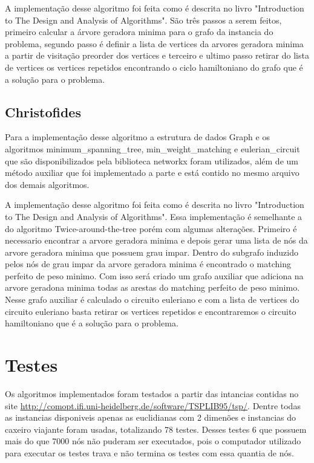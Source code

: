 \documentclass[12pt]{article}
\begin{document}
A implementação desse algoritmo foi feita como é descrita no livro "Introduction to The Design and Analysis of Algorithms". São três passos a serem feitos, primeiro calcular a árvore geradora minima para o grafo da instancia do problema, segundo passo é definir a lista de vertices da arvores geradora minima a partir de visitação preorder dos vertices e terceiro e ultimo passo retirar do lista de vertices os vertices repetidos encontrando o ciclo hamiltoniano do grafo que é a solução para o problema.

\subsection{Christofides}

Para a implementação desse algoritmo a estrutura de dados Graph e os algoritmos minimum\_spanning\_tree, min\_weight\_matching e eulerian\_circuit que são disponibilizados pela biblioteca networkx foram utilizados, além de um método auxiliar que foi implementado a parte e está contido no mesmo arquivo dos demais algoritmos.

A implementação desse algoritmo foi feita como é descrita no livro "Introduction to The Design and Analysis of Algorithms". Essa implementação é semelhante a do algoritmo Twice-around-the-tree porém com algumas alterações. Primeiro é necessario encontrar a arvore geradora minima e depois gerar uma lista de nós da arvore geradora minima que possuem grau impar. Dentro do subgrafo induzido pelos nós de grau impar da arvore geradora minima é encontrado o matching perfeito de peso minimo. Com isso será criado um grafo auxiliar que adiciona na arvore geradona minima todas as arestas do matching perfeito de peso minimo. Nesse grafo auxiliar é calculado o circuito euleriano e com a lista de vertices do circuito euleriano basta retirar os vertices repetidos e encontraremos o circuito hamiltoniano que é a solução para o problema.

\section{Testes}

Os algoritmos implementados foram testados a partir das intancias contidas no site \url{http://comopt.ifi.uni-heidelberg.de/software/TSPLIB95/tsp/}. Dentre todas as instancias disponiveis apenas as euclidianas com 2 dimenões e instancias do caxeiro viajante foram usadas, totalizando 78 testes. Desses testes 6 que possuem mais do que 7000 nós não puderam ser executados, pois o computador utilizado para executar os testes trava e não termina os testes com essa quantia de nós.
\end{document}
